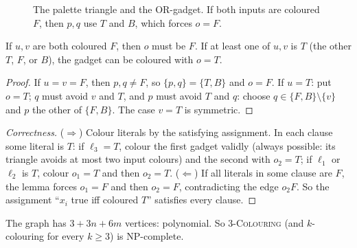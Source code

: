 \begin{figure}[H]
\centering
{}
\caption{The palette triangle and the OR-gadget. If both inputs are
coloured $F$, then $p,q$ use $T$ and $B$, which forces $o=F$.}
\end{figure}
\begin{lemma}[OR-gadget]
If $u,v$ are both coloured $F$, then $o$ must be $F$. If at least one of $u,v$ is $T$ (the other $T$, $F$, or $B$), the gadget can be coloured with $o=T$.
\end{lemma}
\begin{proof}
If $u=v=F$, then $p,q\ne F$, so $\{p,q\}=\{T,B\}$ and $o=F$. If $u=T$: put $o=T$; $q$ must avoid $v$ and $T$, and $p$ must avoid $T$ and $q$: choose $q\in\{F,B\}\setminus\{v\}$
and $p$ the other of $\{F,B\}$. The case $v=T$ is symmetric.
\end{proof}
\begin{proof}[Correctness]
($\Rightarrow$) Colour literals by the satisfying assignment. In each clause some literal is $T$: if $\ell_3=T$, colour the first gadget validly (always possible:
its triangle avoids at most two input colours) and the second with $o_2=T$; if $\ell_1$ or $\ell_2$ is $T$, colour $o_1=T$ and then $o_2=T$.
($\Leftarrow$) If all literals in some clause are $F$, the lemma forces $o_1=F$ and then $o_2=F$, contradicting the edge $o_2F$. So the assignment ``$x_i$ true iff coloured $T$'' satisfies every clause.
\end{proof}
The graph has $3+3n+6m$ vertices: polynomial. So \textsc{3-Colouring} (and $k$-colouring for every $k\ge3$) is NP-complete.

